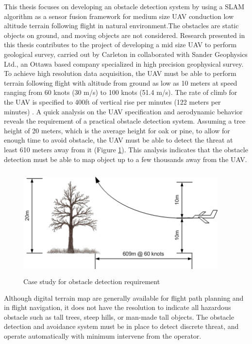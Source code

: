 This thesis focuses on developing an obstacle detection system by using
a SLAM algorithm as a sensor fusion framework for medium size UAV
conduction low altitude terrain following flight in natural
environment.The obstacles are static objects on ground, and moving
objects are not considered. Research presented in this thesis
contributes to the project of developing a mid size UAV to perform
geological survey, carried out by Carleton in collaborated with Sander
Geophysics Ltd., an Ottawa based company specialized in high precision
geophysical survey. To achieve high resolution data acquisition, the
UAV must be able to perform terrain following flight with altitude
from ground as low as 10 meters at speed ranging from 60 knots (30
m/s) to 100 knots (51.4 m/s). The rate of climb for the UAV is
specified to 400ft of vertical rise per minutes (122 meters per
minutes) \cite{james_geosurv_2008}. A quick analysis on the UAV specification and
aerodynamic behavior reveals the requirement of a practical obstacle
detection system. Assuming a tree height of 20 meters, which is the
average height for oak or pine, to allow for enough time to avoid
obstacle, the UAV must be able to detect the threat at least 610
meters away from it (Figure \ref{ob}). This analysis indicates that
the obstacle detection must be able to map object up to a few
thousands away from the UAV.

\begin{figure}[h]
\centering
\includegraphics[width=300pt,height=160pt]{./Figures/ProblemStatement.png}
\caption {Case study for obstacle detection requirement}
\label{ob}
\end{figure}

Although digital terrain map are generally available for flight path 
planning and in flight navigation, it does not have the resolution to 
indicate all hazardous obstacle such as tall trees, steep hills, or 
man-made tall objects. The obstacle detection and avoidance system must 
be in place to detect discrete threat, and operate automatically with 
minimum intervene from the operator. 

